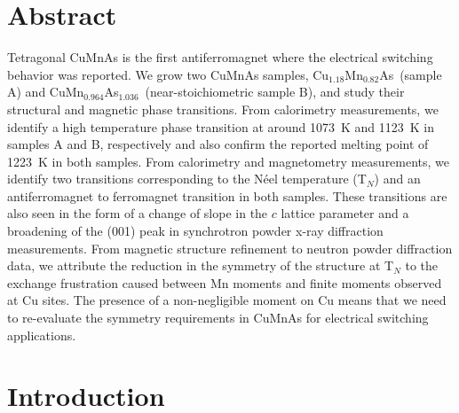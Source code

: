 \documentclass[letterpaper,10pt,doublespacing,edeposit]{uiucthesis2020}
\newcommand*{\cuexcess}{Cu$_{1.18}$Mn$_{0.82}$As}
\newcommand*{\asexcess}{CuMn$_{0.964}$As$_{1.036}$}
\begin{document}
\begin{mainmatter}
\section{Abstract}
Tetragonal CuMnAs is the first antiferromagnet where the electrical switching behavior was reported. 
We grow two CuMnAs samples, \cuexcess\ (sample A) and \asexcess\ (near-stoichiometric sample B), and study their structural and magnetic phase transitions. From calorimetry measurements, we identify a high temperature phase transition at around 1073~K and 1123~K in samples A and B, respectively and also confirm the reported melting point of 1223~K in both samples. From calorimetry and magnetometry measurements, we identify two transitions corresponding to the N\'eel temperature (T$_N$) and an antiferromagnet to ferromagnet transition in both samples. These transitions are also seen in the form of a change of slope in the $c$ lattice parameter and a broadening of the (001) peak in synchrotron powder x-ray diffraction measurements. From magnetic structure refinement to neutron powder diffraction data, we attribute the reduction in the symmetry of the structure at T$_N$ to the exchange frustration caused between Mn moments and finite moments observed at Cu sites. The presence of a non-negligible moment on Cu means that we need to re-evaluate the symmetry requirements in CuMnAs for electrical switching applications.


\section{Introduction} 



\end{mainmatter}
\end{document}
